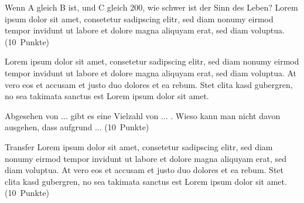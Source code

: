 \documentclass[addpoints,a4paper,ngerman,10pt,answers]{exam}
\begin{document}
\begin{questions}
\clearpage
{}
\addtocounter{counter}{1}
\vspace{.5cm}
\question[10] \parbox[t][][t]{0.68\textwidth}{Wenn A gleich B ist, und C gleich 200, wie schwer ist der Sinn des Leben? Lorem ipsum dolor sit amet, consetetur sadipscing elitr, sed diam nonumy eirmod tempor invidunt ut labore et dolore magna aliquyam erat, sed diam voluptua. \linebreak(10\ Punkte)}

\ifprintanswers
\begin{minipage}{0.7\textwidth}
\begin{solution} 
\parbox[t][][t]{.8\textwidth}{Lorem ipsum dolor sit amet, consetetur sadipscing elitr, sed diam nonumy eirmod tempor invidunt ut labore et dolore magna aliquyam erat, sed diam voluptua. At vero eos et accusam et justo duo dolores et ea rebum. Stet clita kasd gubergren, no sea takimata sanctus est Lorem ipsum dolor sit amet.}
\end{solution}
\end{minipage}
\else
{}
\fi
\vspace{1cm}
\question[10] \parbox[t][][t]{0.68\textwidth}{Abgesehen von ... gibt es eine Vielzahl von ... . Wieso kann man nicht davon ausgehen, dass aufgrund ... \linebreak(10\ Punkte)}

\ifprintanswers
\begin{minipage}{0.7\textwidth}
\begin{solution} 
\parbox[t][][t]{.8\textwidth}{}
\end{solution}
\end{minipage}
\else
{}
\fi
\vspace{1cm}
\question[10] \parbox[t][][t]{0.68\textwidth}{Transfer Lorem ipsum dolor sit amet, consetetur sadipscing elitr, sed diam nonumy eirmod tempor invidunt ut labore et dolore magna aliquyam erat, sed diam voluptua. At vero eos et accusam et justo duo dolores et ea rebum. Stet clita kasd gubergren, no sea takimata sanctus est Lorem ipsum dolor sit amet. \linebreak(10\ Punkte)}


\end{questions}
\end{document}
